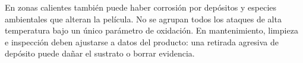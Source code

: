 En zonas calientes también puede haber corrosión por depósitos y especies ambientales que alteran la película. No se agrupan todos los ataques de alta temperatura bajo un único parámetro de oxidación. En mantenimiento, limpieza e inspección deben ajustarse a datos del producto: una retirada agresiva de depósito puede dañar el sustrato o borrar evidencia.
